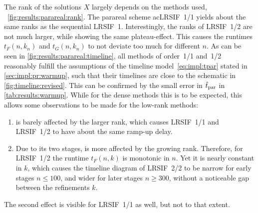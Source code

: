 The rank of the solutions $X$ largely depends on the methods used,
\cf~\autoref{fig:results:parareal:rank}.
The parareal scheme ac{LRSIF}~1/1 yields about the same ranks as the sequential \ac{LRSIF}~1.
Interestingly, the ranks of \ac{LRSIF}~1/2 are not much larger,
while showing the same plateau-effect.
This causes the runtimes $t_F(n, k_n)$ and $t_G(n, k_n)$ to not deviate too much for different $n$.
As can be seen in \autoref{fig:results:parareal:timeline},
all methods of order~1/1 and~1/2
reasonably fulfill the assumptions of the timeline model~\eqref{eq:impl:tpar} stated in \autoref{sec:impl:pr:warmup},
such that their timelines are close to the schematic in \autoref{fig:timeline:revised}.
This can be confirmed by the small error in $\hat t_\text{par}$ in \autoref{tab:results:warmup}.
While for the dense methods this is to be expected,
this allows some observations to be made for the low-rank methods:
\begin{enumerate}
  \item
     is barely affected by the larger rank,
    which causes \ac{LRSIF}~1/1 and \ac{LRSIF}~1/2 to have about the same ramp-up delay.
  \item
    Due to its two stages,  is more affected by the growing rank.
    Therefore, for \ac{LRSIF}~1/2 the runtime $t_F(n, k)$ is monotonic in $n$.
    Yet it is nearly constant in $k$,
    which causes the timeline diagram of \ac{LRSIF}~2/2
    to be narrow for early stages $n \leq 100$,
    and wider for later stages $n \geq 300$,
    without a noticeable gap between the refinements $k$.
\end{enumerate}
The second effect is visible for \ac{LRSIF}~1/1 as well, but not to that extent.

